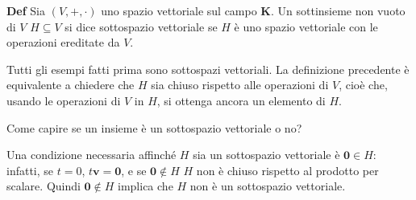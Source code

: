 \documentclass{article}
\begin{document}
\textbf{Def} Sia $\left( V,+,\cdot \right) $ uno spazio vettoriale sul campo 
$\mathbf{K}$. Un sottinsieme non vuoto di $V$ $H\subseteq V$ si dice
sottospazio vettoriale se $H$ \`{e} uno spazio vettoriale con le operazioni
ereditate da $V$.

Tutti gli esempi fatti prima sono sottospazi vettoriali. La definizione
precedente \`{e} equivalente a chiedere che $H$ sia chiuso rispetto alle
operazioni di $V$, cio\`{e} che, usando le operazioni di $V$ in $H$, si
ottenga ancora un elemento di $H$.

Come capire se un insieme \`{e} un sottospazio vettoriale o no?

Una condizione necessaria affinch\'{e} $H$ sia un sottospazio vettoriale 
\`{e} $\mathbf{0}\in H$: infatti, se $t=0$, $t\mathbf{v}=\mathbf{0}$, e se $%
\mathbf{0}\notin H$ $H$ non \`{e} chiuso rispetto al prodotto per scalare.
Quindi $\mathbf{0}\notin H$ implica che $H$ non \`{e} un sottospazio
vettoriale.
\end{document}

